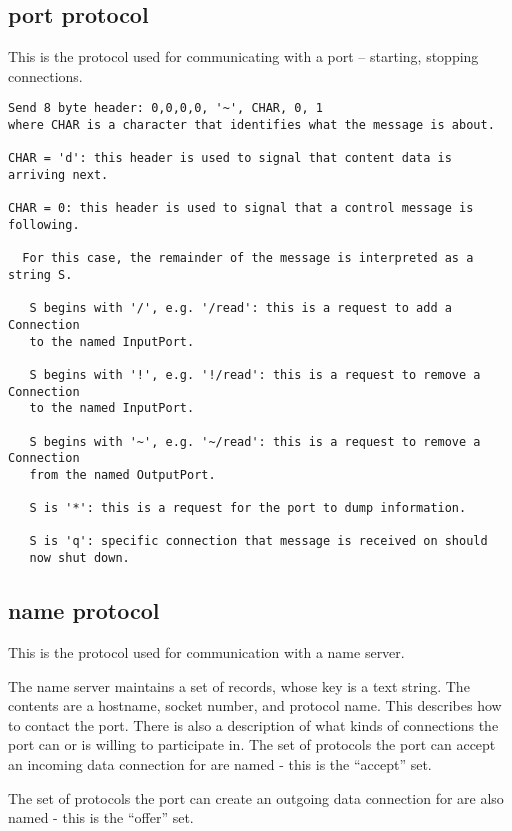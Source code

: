 \documentclass[a4]{article}
\begin{document}
\subsection{port protocol}

This is the protocol used for communicating with a port -- 
starting, stopping connections.

\begin{verbatim}
Send 8 byte header: 0,0,0,0, '~', CHAR, 0, 1
where CHAR is a character that identifies what the message is about.

CHAR = 'd': this header is used to signal that content data is arriving next.

CHAR = 0: this header is used to signal that a control message is following.

  For this case, the remainder of the message is interpreted as a string S.

   S begins with '/', e.g. '/read': this is a request to add a Connection 
   to the named InputPort.

   S begins with '!', e.g. '!/read': this is a request to remove a Connection 
   to the named InputPort.

   S begins with '~', e.g. '~/read': this is a request to remove a Connection 
   from the named OutputPort.

   S is '*': this is a request for the port to dump information.

   S is 'q': specific connection that message is received on should 
   now shut down.

\end{verbatim}



\subsection{name protocol}

This is the protocol used for communication with a name server.

The name server maintains a set of records, whose key is a text
string.  The contents are a hostname, socket number, and protocol
name.  This describes how to contact the port.  There is also
a description of what kinds of connections the port can or is
willing to participate in.  The set of protocols the port can
accept an incoming data connection for are named - this is the 
``accept'' set.

The set of protocols the port can create an outgoing data 
connection for are also named - this is the ``offer'' set.
\end{document}

